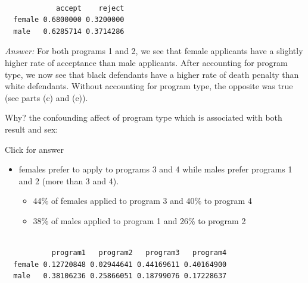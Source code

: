 \documentclass[
]{book}
\newenvironment{Shaded}{\begin{snugshade}}{\end{snugshade}}
\newcommand{\DecValTok}[1]{\textcolor[rgb]{0.00,0.00,0.81}{#1}}
\newcommand{\FunctionTok}[1]{\textcolor[rgb]{0.00,0.00,0.00}{#1}}
\newcommand{\NormalTok}[1]{#1}
\newcommand{\SpecialCharTok}[1]{\textcolor[rgb]{0.00,0.00,0.00}{#1}}
\providecommand{\tightlist}{%
  \setlength{\itemsep}{0pt}\setlength{\parskip}{0pt}}
\begin{document}
\begin{Shaded}
\end{Shaded}

\begin{verbatim}
        
            accept    reject
  female 0.6800000 0.3200000
  male   0.6285714 0.3714286
\end{verbatim}

\emph{Answer:} For both programs 1 and 2, we see that female applicants have a slightly higher rate of acceptance
than male applicants. After accounting for program type, we now see that black defendants have a higher
rate of death penalty than white defendants. Without accounting for program type, the opposite was true
(see parts (c) and (e)).

Why? the confounding affect of program type which is associated with both result and sex:

Click for answer

\begin{itemize}
\tightlist
\item
  females prefer to apply to programs 3 and 4 while males prefer programs 1 and 2 (more than 3 and
  4).

  \begin{itemize}
  \tightlist
  \item
    44\% of females applied to program 3 and 40\% to program 4
  \item
    38\% of males applied to program 1 and 26\% to program 2
  \end{itemize}
\end{itemize}

\begin{Shaded}
\end{Shaded}

\begin{verbatim}
        
           program1   program2   program3   program4
  female 0.12720848 0.02944641 0.44169611 0.40164900
  male   0.38106236 0.25866051 0.18799076 0.17228637
\end{verbatim}
\end{document}
